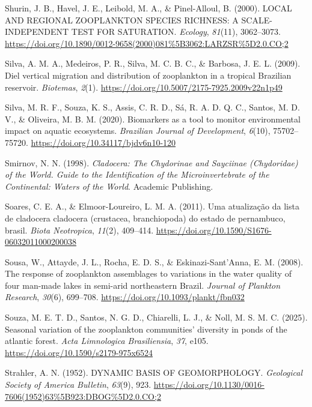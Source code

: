 \documentclass[
  letterpaper,
  DIV=11,
  numbers=noendperiod]{scrartcl}
\newlength{\cslhangindent}
\newenvironment{CSLReferences}[2] %
 {\begin{list}{}{%
  \setlength{\itemindent}{0pt}
  \setlength{\leftmargin}{0pt}
  \setlength{\parsep}{0pt}
  \ifodd #1
   \setlength{\leftmargin}{\cslhangindent}
   \setlength{\itemindent}{-1\cslhangindent}
  \fi
  \setlength{\itemsep}{#2\baselineskip}}}
 {\end{list}}
\begin{document}
\begin{CSLReferences}{1}{0}
Shurin, J. B., Havel, J. E., Leibold, M. A., \& Pinel-Alloul, B. (2000).
LOCAL AND REGIONAL ZOOPLANKTON SPECIES RICHNESS: A SCALE-INDEPENDENT
TEST FOR SATURATION. \emph{Ecology}, \emph{81}(11), 3062--3073.
\url{https://doi.org/10.1890/0012-9658(2000)081\%5B3062:LARZSR\%5D2.0.CO;2}

Silva, A. M. A., Medeiros, P. R., Silva, M. C. B. C., \& Barbosa, J. E.
L. (2009). Diel vertical migration and distribution of zooplankton in a
tropical Brazilian reservoir. \emph{Biotemas}, \emph{2}(1).
\url{https://doi.org/10.5007/2175-7925.2009v22n1p49}

Silva, M. R. F., Souza, K. S., Assis, C. R. D., Sá, R. A. D. Q. C.,
Santos, M. D. V., \& Oliveira, M. B. M. (2020). Biomarkers as a tool to
monitor environmental impact on aquatic ecosystems. \emph{Brazilian
Journal of Development}, \emph{6}(10), 75702--75720.
\url{https://doi.org/10.34117/bjdv6n10-120}

Smirnov, N. N. (1998). \emph{Cladocera: The Chydorinae and Sayciinae
(Chydoridae) of the World. Guide to the Identification of the
Microinvertebrate of the Continental: Waters of the World}. Academic
Publishing.

Soares, C. E. A., \& Elmoor-Loureiro, L. M. A. (2011). Uma atualização
da lista de cladocera cladocera (crustacea, branchiopoda) do estado de
pernambuco, brasil. \emph{Biota Neotropica}, \emph{11}(2), 409--414.
\url{https://doi.org/10.1590/S1676-06032011000200038}

Sousa, W., Attayde, J. L., Rocha, E. D. S., \& Eskinazi-Sant'Anna, E. M.
(2008). The response of zooplankton assemblages to variations in the
water quality of four man-made lakes in semi-arid northeastern Brazil.
\emph{Journal of Plankton Research}, \emph{30}(6), 699--708.
\url{https://doi.org/10.1093/plankt/fbn032}

Souza, M. E. T. D., Santos, N. G. D., Chiarelli, L. J., \& Noll, M. S.
M. C. (2025). Seasonal variation of the zooplankton communities{'}
diversity in ponds of the atlantic forest. \emph{Acta Limnologica
Brasiliensia}, \emph{37}, e105.
\url{https://doi.org/10.1590/s2179-975x6524}

Strahler, A. N. (1952). DYNAMIC BASIS OF GEOMORPHOLOGY. \emph{Geological
Society of America Bulletin}, \emph{63}(9), 923.
\url{https://doi.org/10.1130/0016-7606(1952)63\%5B923:DBOG\%5D2.0.CO;2}


\end{CSLReferences}
\end{document}
